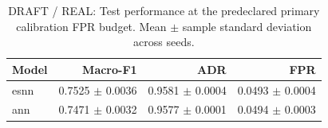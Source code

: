\begin{table}[t]
\centering
\caption{DRAFT / REAL: Test performance at the predeclared primary calibration FPR budget. Mean $\pm$ sample standard deviation across seeds.}
\label{tab:main}
\begin{tabular}{lrrr}
\toprule
Model & Macro-F1 & ADR & FPR \\
\midrule
esnn & 0.7525 $\pm$ 0.0036 & 0.9581 $\pm$ 0.0004 & 0.0493 $\pm$ 0.0004 \\
ann & 0.7471 $\pm$ 0.0032 & 0.9577 $\pm$ 0.0001 & 0.0494 $\pm$ 0.0003 \\
\bottomrule
\end{tabular}
\end{table}
